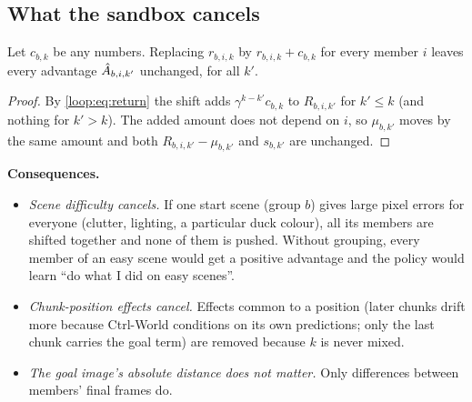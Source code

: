 \subsection{What the sandbox cancels}
\begin{proposition}\label{loop:prop:shift}
Let $c_{b,k}$ be any numbers. Replacing $r_{b,i,k}$ by $r_{b,i,k}+c_{b,k}$ for every member $i$ leaves every advantage $\hat A_{b,i,k'}$ unchanged, for all $k'$.
\end{proposition}
\begin{proof}
By \eqref{loop:eq:return} the shift adds $\gamma^{k-k'}c_{b,k}$ to $R_{b,i,k'}$ for $k'\le k$ (and nothing for $k'>k$). The added amount does not depend on $i$, so $\mu_{b,k'}$ moves by the same amount and both $R_{b,i,k'}-\mu_{b,k'}$ and $s_{b,k'}$ are unchanged.
\end{proof}
\textbf{Consequences.}
\begin{itemize}
\item \emph{Scene difficulty cancels.} If one start scene (group $b$) gives large pixel errors for everyone (clutter, lighting, a particular duck colour), all its members are shifted together and none of them is pushed. Without grouping, every member of an easy scene would get a positive advantage and the policy would learn ``do what I did on easy scenes''.
\item \emph{Chunk-position effects cancel.} Effects common to a position (later chunks drift more because Ctrl-World conditions on its own predictions; only the last chunk carries the goal term) are removed because $k$ is never mixed.
\item \emph{The goal image's absolute distance does not matter.} Only differences between members' final frames do.
\end{itemize}

